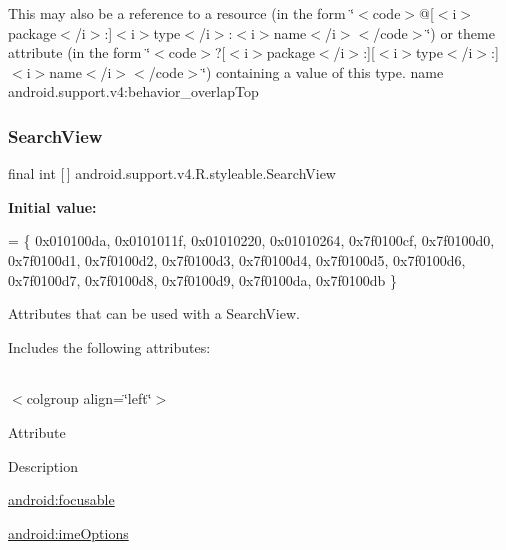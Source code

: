 This may also be a reference to a resource (in the form \char`\"{}$<$code$>$@\mbox{[}$<$i$>$package$<$/i$>$\+:\mbox{]}$<$i$>$type$<$/i$>$\+:$<$i$>$name$<$/i$>$$<$/code$>$\char`\"{}) or theme attribute (in the form \char`\"{}$<$code$>$?\mbox{[}$<$i$>$package$<$/i$>$\+:\mbox{]}\mbox{[}$<$i$>$type$<$/i$>$\+:\mbox{]}$<$i$>$name$<$/i$>$$<$/code$>$\char`\"{}) containing a value of this type.  name android.\+support.\+v4\+:behavior\+\_\+overlap\+Top \mbox{\label{classandroid_1_1support_1_1v4_1_1R_1_1styleable_a7f709410d566e9fd5d4c710e815c300a}} 
\subsubsection{\texorpdfstring{Search\+View}{SearchView}}
{\footnotesize\ttfamily final int \mbox{[}$\,$\mbox{]} android.\+support.\+v4.\+R.\+styleable.\+Search\+View\hspace{0.3cm}{\ttfamily [static]}}

{\bfseries Initial value\+:}
\begin{DoxyCode}
= \{
            0x010100da, 0x0101011f, 0x01010220, 0x01010264,
            0x7f0100cf, 0x7f0100d0, 0x7f0100d1, 0x7f0100d2,
            0x7f0100d3, 0x7f0100d4, 0x7f0100d5, 0x7f0100d6,
            0x7f0100d7, 0x7f0100d8, 0x7f0100d9, 0x7f0100da,
            0x7f0100db
        \}
\end{DoxyCode}
Attributes that can be used with a Search\+View. 

Includes the following attributes\+:

\tabulinesep=1mm
\begin{longtabu} spread 0pt [c]{*{0}{|X[-1]}|}
\hline
\end{longtabu}
$<$colgroup align=\char`\"{}left\char`\"{}$>$ 

Attribute

Description 

{\ttfamily \hyperlink{classandroid_1_1support_1_1v4_1_1R_1_1styleable_a15b3e3cff98da6d5a2c8593d91db27c0}{android\+:focusable}}

{\ttfamily \hyperlink{classandroid_1_1support_1_1v4_1_1R_1_1styleable_aa47416f4b0bf94243cc7bc1d3714bb22}{android\+:ime\+Options}}

